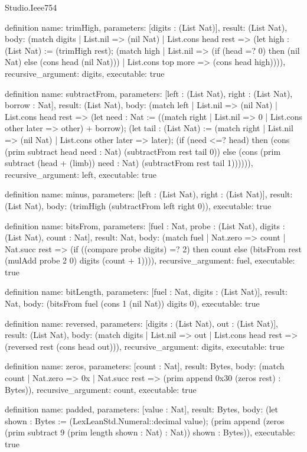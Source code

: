 \begin{lexlean}{Studio.Ieee754}
\begin{semanticmodule}
definition{
  name: trimHigh,
  parameters: [digits : (List Nat)],
  result: (List Nat),
  body: (match digits
    | List.nil => (nil Nat)
    | List.cons head rest => (let high : (List Nat) := (trimHigh rest); (match high
      | List.nil => (if (head =? 0) then (nil Nat) else (cons head (nil Nat)))
      | List.cons top more => (cons head high)))),
  recursive_argument: digits,
  executable: true
}

definition{
  name: subtractFrom,
  parameters: [left : (List Nat), right : (List Nat), borrow : Nat],
  result: (List Nat),
  body: (match left
    | List.nil => (nil Nat)
    | List.cons head rest => (let need : Nat := ((match right
      | List.nil => 0
      | List.cons other later => other) + borrow); (let tail : (List Nat) := (match right
      | List.nil => (nil Nat)
      | List.cons other later => later); (if (need <=? head) then (cons (prim subtract head need : Nat) (subtractFrom rest tail 0)) else (cons (prim subtract (head + (limb)) need : Nat) (subtractFrom rest tail 1)))))),
  recursive_argument: left,
  executable: true
}

definition{
  name: minus,
  parameters: [left : (List Nat), right : (List Nat)],
  result: (List Nat),
  body: (trimHigh (subtractFrom left right 0)),
  executable: true
}

definition{
  name: bitsFrom,
  parameters: [fuel : Nat, probe : (List Nat), digits : (List Nat), count : Nat],
  result: Nat,
  body: (match fuel
    | Nat.zero => count
    | Nat.succ rest => (if ((compare probe digits) =? 2) then count else (bitsFrom rest (mulAdd probe 2 0) digits (count + 1)))),
  recursive_argument: fuel,
  executable: true
}

definition{
  name: bitLength,
  parameters: [fuel : Nat, digits : (List Nat)],
  result: Nat,
  body: (bitsFrom fuel (cons 1 (nil Nat)) digits 0),
  executable: true
}

definition{
  name: reversed,
  parameters: [digits : (List Nat), out : (List Nat)],
  result: (List Nat),
  body: (match digits
    | List.nil => out
    | List.cons head rest => (reversed rest (cons head out))),
  recursive_argument: digits,
  executable: true
}

definition{
  name: zeros,
  parameters: [count : Nat],
  result: Bytes,
  body: (match count
    | Nat.zero => 0x
    | Nat.succ rest => (prim append 0x30 (zeros rest) : Bytes)),
  recursive_argument: count,
  executable: true
}

definition{
  name: padded,
  parameters: [value : Nat],
  result: Bytes,
  body: (let shown : Bytes := (LexLeanStd.Numeral::decimal value); (prim append (zeros (prim subtract 9 (prim length shown : Nat) : Nat)) shown : Bytes)),
  executable: true
}


\end{semanticmodule}
\end{lexlean}
